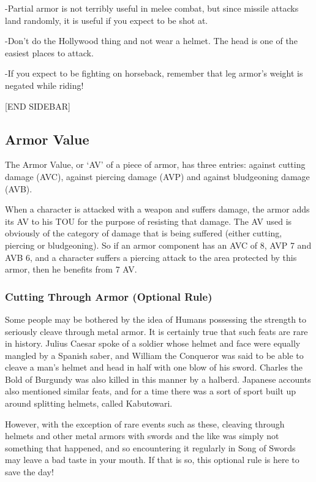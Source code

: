 \documentclass[oneside,11pt,english]{book}
\begin{document}
-Partial armor is not terribly useful in melee combat, but since missile attacks land randomly, it is useful if you expect to be shot at.

-Don’t do the Hollywood thing and not wear a helmet. The head is one of the easiest places to attack.

-If you expect to be fighting on horseback, remember that leg armor’s weight is negated while riding!

[END SIDEBAR]

\subsection{Armor Value}
The Armor Value, or ‘AV’ of a piece of armor, has three entries: against cutting damage (AVC), against piercing 
damage (AVP) and against bludgeoning damage (AVB).

When a character is attacked with a weapon and suffers damage, the armor adds its AV to his TOU for the purpose of 
resisting that damage. The AV used is obviously of the category of damage that is being suffered (either cutting, 
piercing or bludgeoning). So if an armor component has an AVC of 8, AVP 7 and AVB 6, and a character suffers a 
piercing attack to the area protected by this armor, then he benefits from 7 AV.

\subsubsection{Cutting Through Armor (Optional Rule)} %
Some people may be bothered by the idea of Humans possessing the strength to seriously cleave through metal armor.
It is certainly true that such feats are rare in history. Julius Caesar spoke of a soldier whose helmet and face were 
equally mangled by a Spanish saber, and William the Conqueror was said to be able to cleave a man’s helmet and 
head in half with one blow of his sword. Charles the Bold of Burgundy was also killed in this manner by a halberd. 
Japanese accounts also mentioned similar feats, and for a time there was a sort of sport built up around splitting 
helmets, called Kabutowari.

However, with the exception of rare events such as these, cleaving through helmets and other metal armors with 
swords and the like was simply not something that happened, and so encountering it regularly in Song of Swords may 
leave a bad taste in your mouth. If that is so, this optional rule is here to save the day! 
\end{document}
